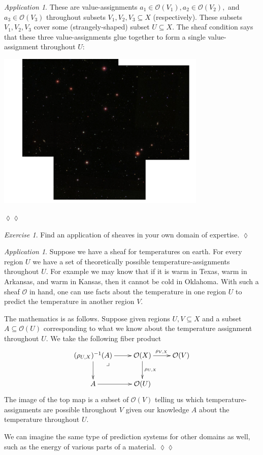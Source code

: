 \documentclass{book}
\makeatletter
\def\mc{\mathcal}
\def\ss{\subseteq}
\def\m1{{-1}}
\def\ullimit{\ar@{}[rd]|(.3)*+{\lrcorner}}
\def\mcO{\mc{O}}
\theoremstyle{remark}
\newtheorem{exc}[subsubsection]{Exercise}
\newenvironment{exercise}{\begin{exc}}{\hspace*{\fill}$\lozenge$\end{exc}}
\newtheorem{app}[subsubsection]{Application}
\newenvironment{application}{\begin{app}}{\hspace*{\fill}$\lozenge\lozenge$\end{app}}
\theoremstyle{definition}
\makeatother
\begin{document}
\begin{application}
These are value-assignments $a_1\in\mcO(V_1), a_2\in\mcO(V_2),$ and $a_3\in\mcO(V_3)$ throughout subsets $V_1,V_2,V_3\ss X$ (respectively). These subsets $V_1,V_2,V_3$ cover some (strangely-shaped) subset $U\ss X$. The sheaf condition says that these three value-assignments glue together to form a single value-assignment throughout $U$:
\begin{center}
\includegraphics[height=7.5cm]{sky123}
\end{center}

\end{application}

\begin{exercise}
Find an application of sheaves in your own domain of expertise.
\end{exercise}

\begin{application}
Suppose we have a sheaf for temperatures on earth. For every region $U$ we have a set of theoretically possible temperature-assignments throughout $U$. For example we may know that if it is warm in Texas, warm in Arkansas, and warm in Kansas, then it cannot be cold in Oklahoma. With such a sheaf $\mcO$ in hand, one can use facts about the temperature in one region $U$ to predict the temperature in another region $V$. 

The mathematics is as follows. Suppose given regions $U,V\ss X$ and a subset $A\ss\mcO(U)$ corresponding to what we know about the temperature assignment throughout $U$. We take the following fiber product
$$
\xymatrix{(\rho_{U,X})^{\m1}(A)\ullimit\ar[r]\ar[d]&\mcO(X)\ar[d]^{\rho_{U,X}}\ar[r]^{\rho_{V,X}}&\mcO(V)\\
A\ar[r]&\mcO(U)}
$$
The image of the top map is a subset of $\mcO(V)$ telling us which temperature-assignments are possible throughout $V$ given our knowledge $A$ about the temperature throughout $U$.

We can imagine the same type of prediction systems for other domains as well, such as the energy of various parts of a material.
\end{application}
\end{document}
